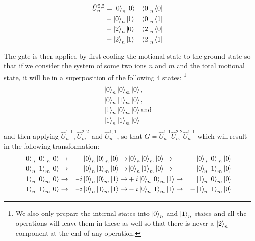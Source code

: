 \begin{equation}
    \begin{aligned}
        \hat{U}^{2,2}_n &= \ket{0}_n\ket{0}&\bra{0}_n\bra{0} \\
        &- \ket{0}_n\ket{1}&\bra{0}_n\bra{1} \\
        &- \ket{2}_n\ket{0}&\bra{2}_n\bra{0} \\
        &+ \ket{2}_n\ket{1}&\bra{2}_n\bra{1}
    \end{aligned}
\end{equation}

The gate is then applied by first cooling the motional state to the ground state so that if we consider the system of some two ions $n$ and $m$ and the total motional state, it will be in a superposition of the following 4 states:
\footnote{We also only prepare the internal states into $\ket{0}_n$ and $\ket{1}_n$ states and all the operations will leave them in these as well so that there is never a $\ket{2}_n$ component at the end of any operation.}
\begin{equation}\label{eqn:ovrl_states}
    \begin{aligned}
        &\ket{0}_n\ket{0}_m\ket{0}, \\
        &\ket{0}_n\ket{1}_m\ket{0}, \\
        &\ket{1}_n\ket{0}_m\ket{0} \text{and} \\
        &\ket{1}_n\ket{1}_m\ket{0}
    \end{aligned}
\end{equation}
and then applying $\hat{U}^{1,1}_n$, $\hat{U}^{2,2}_m$ and $\hat{U}^{1,1}_n$, so that $\hat{G} = \hat{U}^{1,1}_n \hat{U}^{2,2}_m \hat{U}^{1,1}_n$ which will result in the following transformation:
\begin{equation}
    \begin{aligned}
        &\ket{0}_n\ket{0}_m\ket{0} \rightarrow & \ket{0}_n\ket{0}_m\ket{0} \rightarrow & \ket{0}_n\ket{0}_m\ket{0} \rightarrow & \ket{0}_n\ket{0}_m\ket{0} \\
        &\ket{0}_n\ket{1}_m\ket{0} \rightarrow & \ket{0}_n\ket{1}_m\ket{0} \rightarrow & \ket{0}_n\ket{1}_m\ket{0} \rightarrow & \ket{0}_n\ket{1}_m\ket{0} \\
        &\ket{1}_n\ket{0}_m\ket{0} \rightarrow & -i\ket{0}_n\ket{0}_m\ket{1} \rightarrow & +i\ket{0}_n\ket{0}_m\ket{1} \rightarrow & \ket{1}_n\ket{0}_m\ket{0} \\
        &\ket{1}_n\ket{1}_m\ket{0} \rightarrow & -i\ket{0}_n\ket{1}_m\ket{1} \rightarrow & -i\ket{0}_n\ket{1}_m\ket{1} \rightarrow & -\ket{1}_n\ket{1}_m\ket{0}
    \end{aligned}
\end{equation}

